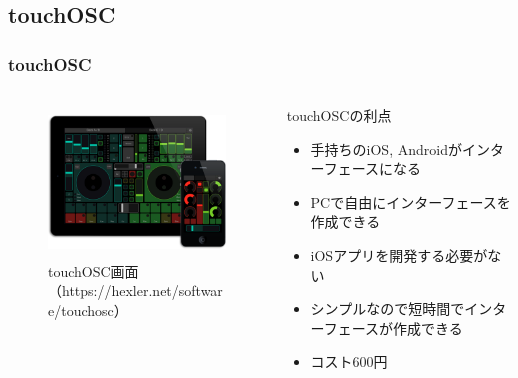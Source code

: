 \documentclass[10pt, dvipdfmx]{beamer}
\begin{document}
    \subsection{touchOSC}
        \begin{frame}
            \frametitle{touchOSC}
            \begin{columns}[c]
                \begin{column}{0.50\textwidth}
                    \begin{figure}[htb]
                        \includegraphics[height=40mm]{images/touch-1.png}
                        \caption{touchOSC画面（https://hexler.net/software/touchosc）}
                        \label{fig:touch-1}
                    \end{figure}
                \end{column}
                \begin{column}{0.50\textwidth}
                    \begin{block}{touchOSCの利点}
                        \begin{itemize}
                            \tiny
                            \item 手持ちのiOS, Androidがインターフェースになる
                            \item PCで自由にインターフェースを作成できる
                            \item iOSアプリを開発する必要がない
                            \item シンプルなので短時間でインターフェースが作成できる
                            \item コスト600円
                        \end{itemize}
                    \end{block}
                \end{column}
            \end{columns}
        \end{frame}
\end{document}
